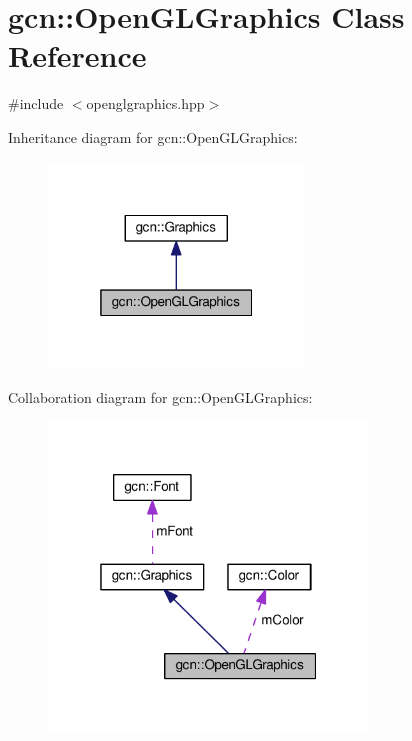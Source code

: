 \hypertarget{classgcn_1_1OpenGLGraphics}{}\section{gcn\+:\+:Open\+G\+L\+Graphics Class Reference}
\label{classgcn_1_1OpenGLGraphics}


{\ttfamily \#include $<$openglgraphics.\+hpp$>$}



Inheritance diagram for gcn\+:\+:Open\+G\+L\+Graphics\+:\nopagebreak
\begin{figure}[H]
\begin{center}
\leavevmode
\includegraphics[width=193pt]{classgcn_1_1OpenGLGraphics__inherit__graph}
\end{center}
\end{figure}


Collaboration diagram for gcn\+:\+:Open\+G\+L\+Graphics\+:\nopagebreak
\begin{figure}[H]
\begin{center}
\leavevmode
\includegraphics[width=241pt]{classgcn_1_1OpenGLGraphics__coll__graph}
\end{center}
\end{figure}
